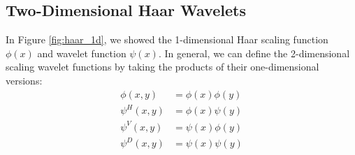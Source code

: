\subsection{Two-Dimensional Haar Wavelets}
In Figure \ref{fig:haar_1d}, we showed the 1-dimensional Haar scaling function $\phi(x)$ and wavelet function $\psi(x)$.
In general, we can define the 2-dimensional scaling wavelet functions by taking the products of their one-dimensional versions:
\begin{equation}
\label{eqn:2d_haar_wavelets}
  \begin{split}
    \phi(x,y) &= \phi(x) \phi(y)\\
    \psi^H(x,y) &= \phi(x) \psi(y) \\
    \psi^V(x,y) &= \psi(x) \phi(y) \\
    \psi^D(x,y) &= \psi(x) \psi(y)
  \end{split}
\end{equation}

